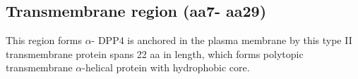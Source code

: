 \subsection{Transmembrane region (aa7- aa29)}

This region forms $\alpha$-
DPP4 is anchored in the plasma membrane by this type II transmembrane protein spans 22 aa in length, which forms polytopic transmembrane $\alpha$-helical protein with hydrophobic core.~\cite{Hong_1990} 


